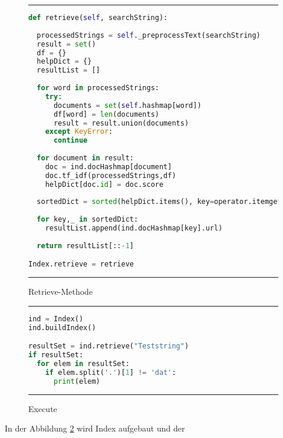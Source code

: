 \begin{figure}[h]
	\rule{\textwidth}{0.4pt}
		\begin{lstlisting}[language=Python]
def retrieve(self, searchString):
 
  processedStrings = self._preprocessText(searchString)
  result = set()
  df = {}
  helpDict = {}
  resultList = []
    
  for word in processedStrings:
    try:
      documents = set(self.hashmap[word])
      df[word] = len(documents)
      result = result.union(documents)
    except KeyError:
      continue
    
  for document in result:
    doc = ind.docHashmap[document]
    doc.tf_idf(processedStrings,df)
    helpDict[doc.id] = doc.score
        
  sortedDict = sorted(helpDict.items(), key=operator.itemgetter(1))
    
  for key,_ in sortedDict:
    resultList.append(ind.docHashmap[key].url)
        
  return resultList[::-1]

Index.retrieve = retrieve
		\end{lstlisting}
	\rule{\textwidth}{0.4pt}
	\caption{Retrieve-Methode}
	\label{fig:retrieve}
\end{figure}

\begin{figure}[h]
	\rule{\textwidth}{0.4pt}
		\begin{lstlisting}[language=Python]
ind = Index()
ind.buildIndex()

resultSet = ind.retrieve("Teststring")
if resultSet:
  for elem in resultSet:
    if elem.split('.')[1] != 'dat':
      print(elem)
		\end{lstlisting}
	\rule{\textwidth}{0.4pt}
	\caption{Execute}
	\label{fig:execute}
\end{figure}

In der Abbildung \ref{fig:execute} wird Index aufgebaut und der